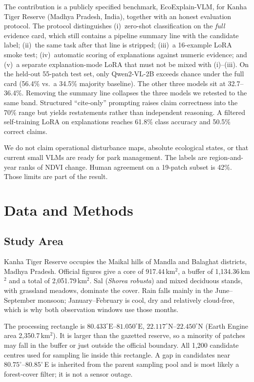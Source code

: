 \documentclass[11pt]{article}
\begin{document}
The contribution is a publicly specified benchmark, EcoExplain-VLM,
for Kanha Tiger Reserve (Madhya Pradesh, India), together with an
honest evaluation protocol. The protocol distinguishes (i)~zero-shot
classification on the \emph{full} evidence card, which still contains a
pipeline summary line with the candidate label; (ii)~the same task
after that line is stripped; (iii)~a 16-example LoRA smoke test;
(iv)~automatic scoring of explanations against numeric evidence; and
(v)~a separate explanation-mode LoRA that must not be mixed with
(i)--(iii). On the held-out 55-patch test set, only Qwen2-VL-2B exceeds
chance under the full card (56.4\% vs.\ a 34.5\% majority baseline).
The other three models sit at 32.7--36.4\%. Removing the summary line
collapses the three models we retested to the same band. Structured
``cite-only'' prompting raises claim correctness into the 70\% range
but yields restatements rather than independent reasoning. A filtered
self-training LoRA on explanations reaches 61.8\% class accuracy and
50.5\% correct claims.

We do not claim operational disturbance maps, absolute ecological
states, or that current small VLMs are ready for park management. The
labels are region-and-year ranks of NDVI change. Human agreement on a
19-patch subset is 42\%. Those limits are part of the result.


\section{Data and Methods}

\subsection{Study Area}

Kanha Tiger Reserve occupies the Maikal hills of Mandla and Balaghat
districts, Madhya Pradesh. Official figures give a core of
917.44\,km$^2$, a buffer of 1,134.36\,km$^2$ and a total of
2,051.79\,km$^2$. Sal (\emph{Shorea robusta}) and mixed deciduous
stands, with grassland meadows, dominate the cover. Rain falls mainly
in the June--September monsoon; January--February is cool, dry and
relatively cloud-free, which is why both observation windows use those
months.

The processing rectangle is
$80.433^\circ\mathrm{E}$--$81.050^\circ\mathrm{E}$,
$22.117^\circ\mathrm{N}$--$22.450^\circ\mathrm{N}$
(Earth Engine area 2,350.7\,km$^2$). It is larger than the gazetted
reserve, so a minority of patches may fall in the buffer or just
outside the official boundary. All 1,200 candidate centres used for
sampling lie inside this rectangle. A gap in candidates near
$80.75^\circ$--$80.85^\circ$\,E is inherited from the parent sampling
pool and is most likely a forest-cover filter; it is not a sensor
outage.
\end{document}
